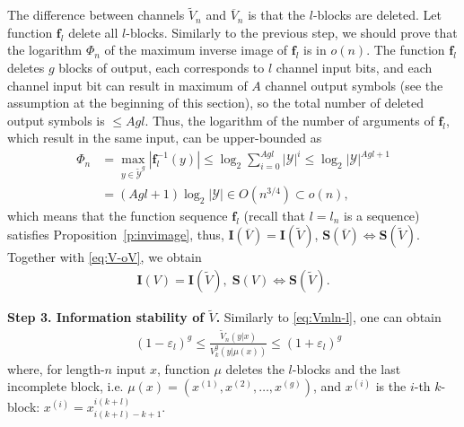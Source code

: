 \documentclass[journal, twocol]{IEEEtran}
\newcommand{\bff}{{\mathbf{f}}}
\newcommand{\bfI}{{\mathbf{I}}}
\newcommand{\bfS}{{\mathbf{S}}}
\newcommand{\oV}{{\overline{V}}}
\newcommand{\tV}{{\widetilde{V}}}
\newcommand{\mY}{{\mathcal{Y}}}
\newcommand{\tmY}{{\widetilde{\mY}}}
\newcommand{\abs}[1]{\left|{#1}\right|}
\newcommand{\ve}{\varepsilon}
\begin{document}
The difference between channels $\tV_n$  and $\oV_n$ is that the $l$-blocks are deleted.
Let function $\bff_l$ delete all $l$-blocks.
Similarly to the previous step, we should prove that the logarithm $\Phi_n$ of the maximum inverse image of $\bff_l$ is in $o(n)$.
The function $\bff_l$ deletes $g$ blocks of output, each corresponds to $l$ channel input bits, and each channel input bit can result in maximum of $A$ channel output symbols (see the assumption at the beginning of this section), so the total number of deleted output symbols is $\leq Agl$.
Thus, the logarithm of the number of arguments of $\bff_l$, which result in the same input, can be upper-bounded as
\begin{align}
\Phi_n &=\max_{y\in \tmY^g}\abs{\bff_l^{-1}(y)}\leq \log_2\sum_{i=0}^{Agl}|\mY|^i \leq \log_2|\mY|^{Agl+1}
\nonumber\\
&= (Agl+1)\log_2|\mY|\in O(n^{3/4}) \subset o(n),
\end{align}
which means that the function sequence $\bff_{l}$ (recall that $l=l_n$ is a sequence) satisfies Proposition~\ref{p:invimage}, thus, $\bfI(\oV)=\bfI(\tV)$, $\bfS(\oV)\iff \bfS(\tV)$.
Together with \eqref{eq:V-oV}, we obtain
\begin{align}
\bfI(V)=\bfI(\tV),\; \bfS(V)\iff \bfS(\tV). 
\label{eq:V-tV}
\end{align}


\textbf{Step 3. Information stability of $\tV$.}
Similarly to \eqref{eq:Vmln-l}, one can obtain
\begin{align}
&(1-\ve_{l})^g \leq \frac{\tV_{n}(y|x)}{V^g_{k}(y|\mu(x))}
\leq (1+\ve_{l})^g
\label{eq:tVbounded}
\end{align}
where, for length-$n$ input $x$, function $\mu$ deletes the $l$-blocks and the last incomplete block, i.e. $\mu(x)=(x^{(1)},x^{(2)}, \dots, x^{(g)})$, and $x^{(i)}$ is the $i$-th $k$-block: $x^{(i)}=x_{i(k+l)-k+1}^{i(k+l)}$. 
\end{document}
